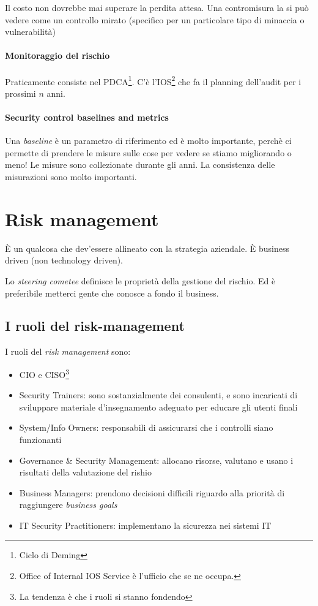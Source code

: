 Il costo non dovrebbe mai superare la perdita attesa.
Una contromisura la si pu\`o vedere come un controllo mirato (specifico per un
particolare tipo di minaccia o vulnerabilità)


\paragraph*{Monitoraggio del rischio}

Praticamente consiste nel PDCA\footnote{Ciclo di Deming}.
C'è l'IOS\footnote{Office of Internal IOS Service è l'ufficio che se ne occupa.}
che fa il planning dell'audit per i prossimi $n$ anni.


\paragraph*{Security control baselines and metrics}

Una \textit{baseline} è un parametro di riferimento ed è molto importante,
perchè ci permette di prendere le misure sulle cose per vedere se stiamo
migliorando o meno!
Le misure sono collezionate durante gli anni. La consistenza delle misurazioni
sono molto importanti.

\section{Risk management}
È un qualcosa che dev'essere allineato con la strategia aziendale.
È business driven (non technology driven).


Lo \textit{steering cometee} definisce le proprietà della gestione del rischio.
Ed è preferibile metterci gente che conosce a fondo il business.

\subsection{I ruoli del risk-management}

I ruoli del \textit{risk management} sono:
\begin{itemize}
\item CIO e CISO\footnote{La tendenza è che i ruoli si stanno fondendo}
\item Security Trainers: sono sostanzialmente dei consulenti, e sono incaricati
di sviluppare materiale d'insegnamento adeguato per educare gli utenti finali
\item System/Info Owners: responsabili di assicurarsi che i controlli siano
funzionanti
\item Governance \& Security Management: allocano risorse, valutano e usano i
risultati della valutazione del rishio
\item Business Managers: prendono decisioni difficili riguardo alla priorit\`a
di raggiungere \textit{business goals}
\item IT Security Practitioners: implementano la sicurezza nei sistemi IT
\end{itemize}

